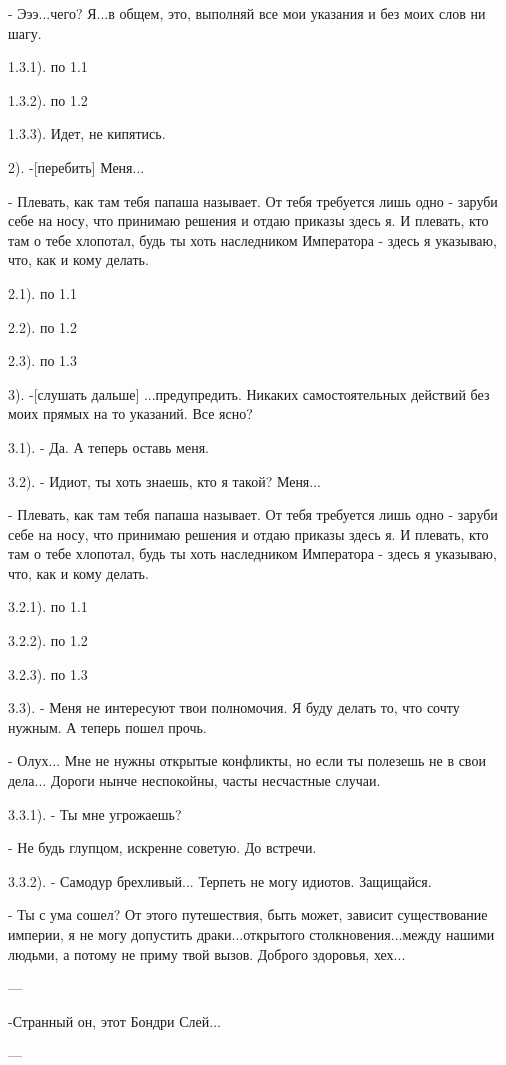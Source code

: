 \documentclass[12pt,a4paper]{book}
\begin{document}
- Эээ...чего? Я...в общем, это, выполняй все мои указания и без моих слов ни шагу.

1.3.1). по 1.1

1.3.2). по 1.2

1.3.3). Идет, не кипятись. 

2). -[перебить] Меня...

- Плевать, как там тебя папаша называет. От тебя требуется лишь одно - заруби себе на носу, что принимаю решения и отдаю приказы здесь я. И плевать, кто там о тебе хлопотал, будь ты хоть наследником Императора - здесь я указываю, что, как и кому делать.

2.1). по 1.1

2.2). по 1.2

2.3). по 1.3

3). -[слушать дальше] ...предупредить. Никаких самостоятельных действий без моих прямых на то указаний. Все ясно?

3.1). - Да. А теперь оставь меня.

3.2). - Идиот, ты хоть знаешь, кто я такой? Меня...

- Плевать, как там тебя папаша называет. От тебя требуется лишь одно - заруби себе на носу, что принимаю решения и отдаю приказы здесь я. И плевать, кто там о тебе хлопотал, будь ты хоть наследником Императора - здесь я указываю, что, как и кому делать.

3.2.1). по 1.1

3.2.2). по 1.2

3.2.3). по 1.3

3.3). - Меня не интересуют твои полномочия. Я буду делать то, что сочту нужным. А теперь пошел прочь.

- Олух... Мне не нужны открытые конфликты, но если ты полезешь не в свои дела... Дороги нынче неспокойны, часты несчастные случаи.

3.3.1). - Ты мне угрожаешь?

- Не будь глупцом, искренне советую. До встречи.

3.3.2). - Самодур брехливый... Терпеть не могу идиотов. Защищайся.

- Ты с ума сошел? От этого путешествия, быть может, зависит существование империи, я не могу допустить драки...открытого столкновения...между нашими людьми, а потому не приму твой вызов. Доброго здоровья, хех...

---

-Странный он, этот Бондри Слей...

---
\end{document}
